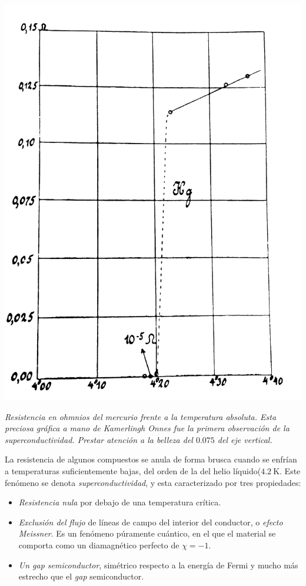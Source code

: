 \documentclass{tufte-book}
\begin{document}
\begin{marginfigure}
  \centering
  \includegraphics[width=\textwidth]{figures/smoothkamerlingh.jpg}
  \caption{\itshape Resistencia en ohmnios del mercurio frente a la temperatura
  absoluta. Esta preciosa gráfica a mano de Kamerlingh Onnes fue la
  primera observación de la superconductividad. Prestar atención a la
  belleza del $0.075$ del eje vertical.}
  \label{fig:smoothkamerlingh}
\end{marginfigure}

La resistencia de algunos compuestos se anula de forma brusca cuando
se enfrían a temperaturas suficientemente bajas, del orden de la del
helio líquido($\SI{4.2}{\kelvin}$. Este fenómeno se denota
\emph{superconductividad}, y esta caracterizado por tres propiedades:

\begin{itemize}
\item \textit{Resistencia nula} por debajo de una temperatura crítica.
\item \textit{Exclusión del flujo} de líneas de campo del interior del
  conductor, o \emph{efecto Meissner}. Es un fenómeno púramente
  cuántico, en el que el material se comporta como un diamagnético
  perfecto de $χ=-1$.
\item \textit{Un gap semiconductor}, simétrico respecto a la energía
  de Fermi y mucho más estrecho que el \textit{gap} semiconductor.
\end{itemize}
\end{document}
